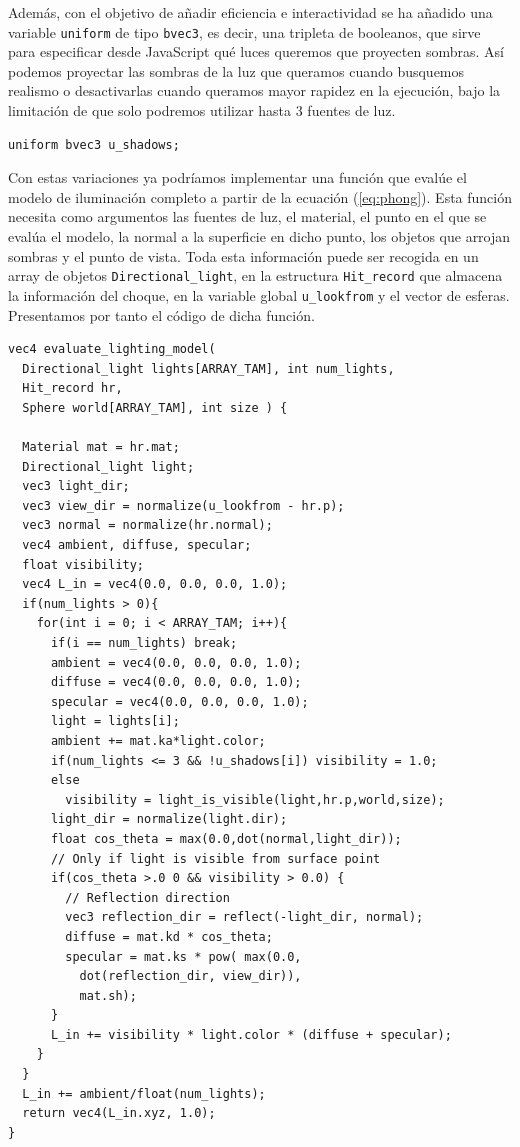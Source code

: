 Además, con el objetivo de añadir eficiencia e interactividad se ha añadido una variable \verb|uniform| de tipo \verb|bvec3|, es decir, una tripleta de booleanos, que sirve para especificar desde JavaScript qué luces queremos que proyecten sombras. Así podemos proyectar las sombras de la luz que queramos cuando busquemos realismo o desactivarlas cuando queramos mayor rapidez en la ejecución, bajo la limitación de que solo podremos utilizar hasta 3 fuentes de luz.

\begin{lstlisting}
uniform bvec3 u_shadows;
\end{lstlisting}

Con estas variaciones ya podríamos implementar una función que evalúe el modelo de iluminación completo a partir de la ecuación (\ref{eq:phong}). Esta función necesita como argumentos las fuentes de luz, el material, el punto en el que se evalúa el modelo, la normal a la superficie en dicho punto, los objetos que arrojan sombras y el punto de vista. Toda esta información puede ser recogida en un array de objetos \verb|Directional_light|, en la estructura \verb|Hit_record| que almacena la información del choque, en la variable global \verb|u_lookfrom| y el vector de esferas. Presentamos por tanto el código de dicha función.

\begin{lstlisting}
vec4 evaluate_lighting_model( 
  Directional_light lights[ARRAY_TAM], int num_lights, 
  Hit_record hr,
  Sphere world[ARRAY_TAM], int size ) {
  
  Material mat = hr.mat;
  Directional_light light;
  vec3 light_dir;
  vec3 view_dir = normalize(u_lookfrom - hr.p);
  vec3 normal = normalize(hr.normal);
  vec4 ambient, diffuse, specular;
  float visibility;
  vec4 L_in = vec4(0.0, 0.0, 0.0, 1.0);
  if(num_lights > 0){
    for(int i = 0; i < ARRAY_TAM; i++){
      if(i == num_lights) break;
      ambient = vec4(0.0, 0.0, 0.0, 1.0);
      diffuse = vec4(0.0, 0.0, 0.0, 1.0);
      specular = vec4(0.0, 0.0, 0.0, 1.0);
      light = lights[i];
      ambient += mat.ka*light.color;
      if(num_lights <= 3 && !u_shadows[i]) visibility = 1.0;
      else 
        visibility = light_is_visible(light,hr.p,world,size);
      light_dir = normalize(light.dir);
      float cos_theta = max(0.0,dot(normal,light_dir));
      // Only if light is visible from surface point
      if(cos_theta >.0 0 && visibility > 0.0) {
        // Reflection direction
        vec3 reflection_dir = reflect(-light_dir, normal);
        diffuse = mat.kd * cos_theta;
        specular = mat.ks * pow( max(0.0, 
          dot(reflection_dir, view_dir)), 
          mat.sh);
      }
      L_in += visibility * light.color * (diffuse + specular);
    }
  }
  L_in += ambient/float(num_lights);
  return vec4(L_in.xyz, 1.0);
}
\end{lstlisting}

